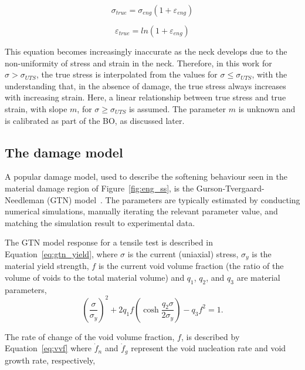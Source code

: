 \documentclass[preprint, review, 12pt]{elsarticle}
\begin{document}
	\begin{equation}
		\sigma_{true} = \sigma_{eng} \left( 1 + \varepsilon_{eng} \right)
		\label{eq:true_stress}
	\end{equation}

	\begin{equation}
		\varepsilon_{true} = ln\left( 1 + \varepsilon_{eng} \right)
		\label{eq:true_strain}
	\end{equation}

	This equation becomes increasingly inaccurate as the neck develops due to the non-uniformity of stress and strain in the neck.
	Therefore, in this work for $\sigma > \sigma_{UTS}$, the true stress is interpolated from the values for $\sigma \leq \sigma_{UTS}$, with the understanding that, in the absence of damage, the true stress always increases with increasing strain.
	Here, a linear relationship between true stress and true strain, with slope $m$, for $\sigma \ge \sigma_{UTS}$ is assumed.
	The parameter $m$ is unknown and is calibrated as part of the BO, as discussed later.

	\subsection{The damage model}
	\label{h:damage_model}

	A popular damage model, used to describe the softening behaviour seen in the material damage region of Figure~\ref{fig:eng_ss}, is the Gurson-Tvergaard-Needleman (GTN) model~\cite{WCISLIK2016, CHAHBOUB2019, TVERGAARD1984a}.
	The parameters are typically estimated by conducting numerical simulations, manually iterating the relevant parameter value, and matching the simulation result to experimental data.

	The GTN model response for a tensile test is described in Equation~\ref{eq:gtn_yield}, where $\sigma$ is the current (uniaxial) stress, $\sigma_y$ is the material yield strength, $f$ is the current void volume fraction (the ratio of the volume of voids to the total material volume) and $q_1$, $q_2$, and $q_3$ are material parameters,
	\begin{equation}
		\left( \frac{\sigma}{\sigma_y} \right)^2 + 2q_{1}f\left( \cosh \frac{q_2 \sigma}{2\sigma_y} \right) - q_3 f^2 = 1.
		\label{eq:gtn_yield}
	\end{equation}

	The rate of change of the void volume fraction, $f$, is described by Equation~\ref{eq:vvf} where $\dot{f}_n$ and $\dot{f}_g$ represent the void nucleation rate and void growth rate, respectively,
\end{document}
